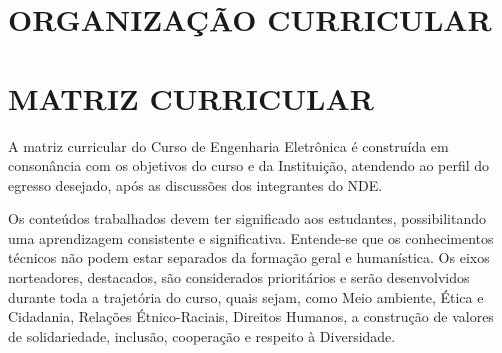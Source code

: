 \section{ORGANIZAÇÃO CURRICULAR}





\section{MATRIZ CURRICULAR}

A matriz curricular do Curso de Engenharia Eletrônica é construída em consonância com os objetivos do curso e da Instituição, atendendo ao perfil do egresso desejado, após as discussões dos integrantes do NDE.

Os conteúdos trabalhados devem ter significado aos estudantes, possibilitando uma aprendizagem consistente e significativa. Entende-se que os conhecimentos técnicos não podem estar separados da formação geral e humanística. Os eixos norteadores, destacados, são considerados prioritários e serão desenvolvidos durante toda a trajetória do curso, quais sejam, como Meio ambiente, Ética e Cidadania, Relações Étnico-Raciais, Direitos Humanos, a construção de valores de solidariedade, inclusão, cooperação e respeito à Diversidade.

